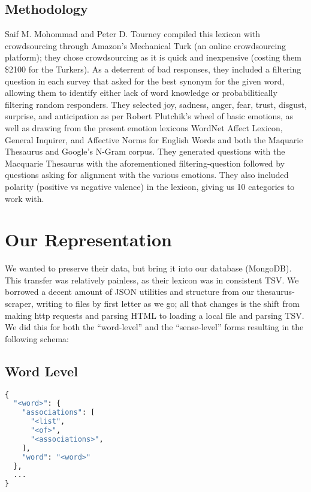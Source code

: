 \documentclass[11pt, twoside, reqno]{book}
\begin{document}
\subsection{Methodology}

Saif M. Mohommad and Peter D. Tourney compiled this lexicon with crowdsourcing through Amazon's Mechanical Turk (an online crowdsourcing platform); they chose crowdsourcing as it is quick and inexpensive (costing them \$2100 for the Turkers). As a deterrent of bad responses, they included a filtering question in each survey that asked for the best synonym for the given word, allowing them to identify either lack of word knowledge or probabilitically filtering random responders. They selected joy, sadness, anger, fear, trust, disgust, surprise, and anticipation as per Robert Plutchik's wheel of basic emotions, as well as drawing from the present emotion lexicons WordNet Affect Lexicon, General Inquirer, and Affective Norms for English Words and both the Maquarie Thesaurus and Google's N-Gram corpus. They generated questions with the Macquarie Thesaurus with the aforementioned filtering-question followed by questions asking for alignment with the various emotions. They also included polarity (positive vs negative valence) in the lexicon, giving us 10 categories to work with.

\section{Our Representation}

We wanted to preserve their data, but bring it into our database (MongoDB). This transfer was relatively painless, as their lexicon was in consistent TSV. We borrowed a decent amount of JSON utilities and structure from our thesaurus-scraper, writing to files by first letter as we go; all that changes is the shift from making http requests and parsing HTML to loading a local file and parsing TSV. We did this for both the ``word-level'' and the ``sense-level'' forms resulting in the following schema:

\subsection{Word Level}
\begin{lstlisting}[language=Python]
{
  "<word>": {
    "associations": [
      "<list",
      "<of>",
      "<associations>",
    ],
    "word": "<word>"
  },
  ...
}
\end{lstlisting}
\end{document}
